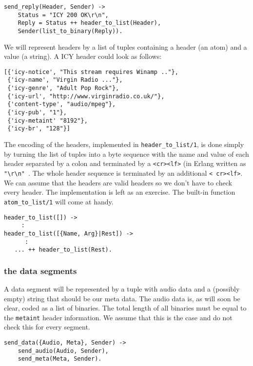 \documentclass[a4paper,11pt]{article}
\begin{document}
\begin{verbatim}
send_reply(Header, Sender) ->
    Status = "ICY 200 OK\r\n",
    Reply = Status ++ header_to_list(Header),
    Sender(list_to_binary(Reply)).
\end{verbatim}

We will represent headers by a list of tuples containing a header (an
atom) and a value (a string). A ICY header could look as follows:

\begin{verbatim}
[{'icy-notice', "This stream requires Winamp .."}, 
 {'icy-name', "Virgin Radio ..."}, 
 {'icy-genre', "Adult Pop Rock"}, 
 {'icy-url', "http://www.virginradio.co.uk/"}, 
 {'content-type', "audio/mpeg"},
 {'icy-pub', "1"}, 
 {'icy-metaint' "8192"}, 
 {'icy-br', "128"}]
\end{verbatim}

The encoding of the headers, implemented in {\tt header\_to\_list/1},
is done simply by turning the list of tuples into a byte sequence with
the name and value of each header separated by a colon and terminated
by a {\tt \textless cr\textgreater\textless lf\textgreater } (in Erlang
written as {\tt "\textbackslash r\textbackslash n" }. The whole header
sequence is terminated by an additional {\tt \textless
  cr\textgreater\textless lf\textgreater }. We can assume that the
headers are valid headers so we don't have to check every header. The
implementation is left as an exercise. The built-in function {\tt
  atom\_to\_list/1} will come at handy.

\begin{verbatim}
header_to_list([]) ->
     :
header_to_list([{Name, Arg}|Rest]) ->
      :
   ... ++ header_to_list(Rest).
\end{verbatim}


\subsubsection{the data segments}

A data segment will be represented by a tuple with audio data and a
(possibly empty) string that should be our meta data. The audio data
is, as will soon be clear, coded as a list of binaries. The total
length of all binaries must be equal to the {\tt metaint} header
information. We assume that this is the case and do not check this for
every segment.


\begin{verbatim}
send_data({Audio, Meta}, Sender) ->
    send_audio(Audio, Sender),
    send_meta(Meta, Sender).
\end{verbatim}
\end{document}

